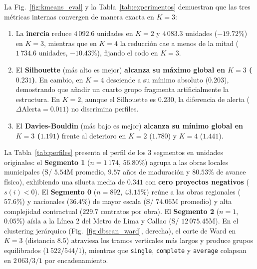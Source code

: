\documentclass[conference]{IEEEtran}
\begin{document}
La Fig.~\ref{fig:kmeans_eval} y la Tabla~\ref{tab:experimentos} demuestran que las tres m\'etricas internas convergen de manera exacta en $K = 3$:
\begin{enumerate}
    \item La \textbf{inercia} reduce $4\,092.6$ unidades en $K = 2$ y $4\,083.3$ unidades ($-19.72\%$) en $K = 3$, mientras que en $K = 4$ la reducci\'on cae a menos de la mitad ($1\,734.6$ unidades, $-10.43\%$), fijando el codo en $K = 3$.
    \item El \textbf{Silhouette} (m\'as alto es mejor) \textbf{alcanza su m\'aximo global en $K = 3$ ($0.231$)}. En cambio, en $K = 4$ desciende a su m\'inimo absoluto ($0.203$), demostrando que a\~nadir un cuarto grupo fragmenta artificialmente la estructura. En $K = 2$, aunque el Silhouette es $0.230$, la diferencia de alerta ($\Delta\text{Alerta} = 0.011$) no discrimina perfiles.
    \item El \textbf{Davies-Bouldin} (m\'as bajo es mejor) \textbf{alcanza su m\'inimo global en $K = 3$ ($1.191$)} frente al deterioro en $K = 2$ ($1.780$) y $K = 4$ ($1.441$).
\end{enumerate}

La Tabla~\ref{tab:perfiles} presenta el perfil de los 3 segmentos en unidades originales: el \textbf{Segmento 1} ($n = 1\,174$, $56.80\%$) agrupa a las obras locales municipales (S/ $5.54$M promedio, $9.57$ a\~nos de maduraci\'on y $80.53\%$ de avance f\'isico), exhibiendo una silueta media de $0.341$ con \textbf{cero proyectos negativos} ($s(i) < 0$). El \textbf{Segmento 0} ($n = 892$, $43.15\%$) re\'une a las obras regionales ($57.6\%$) y nacionales ($36.4\%$) de mayor escala (S/ $74.06$M promedio) y alta complejidad contractual ($229.7$ contratos por obra). El \textbf{Segmento 2} ($n = 1$, $0.05\%$) a\'isla a la L\'inea 2 del Metro de Lima y Callao (S/ $12\,075.45$M). En el clustering jer\'arquico (Fig.~\ref{fig:dbscan_ward}, derecha), el corte de Ward en $K = 3$ (distancia $8.5$) atraviesa los tramos verticales m\'as largos y produce grupos equilibrados ($1\,522 / 544 / 1$), mientras que \texttt{single}, \texttt{complete} y \texttt{average} colapsan en $2\,063 / 3 / 1$ por encadenamiento.
\end{document}
